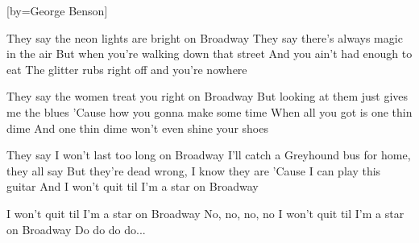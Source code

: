 [by={George Benson}]

  \beginverse
  They say the neon lights are bright on Broadway
  They say there's always magic in the air
  But when you're walking down that street
  And you ain't had enough to eat
  The glitter rubs right off and you're nowhere
  \endverse

  \beginverse
  They say the women treat you right on Broadway
  But looking at them just gives me the blues
  'Cause how you gonna make some time
  When all you got is one thin dime
  And one thin dime won't even shine your shoes
  \endverse

  \beginverse
  They say I won't last too long on Broadway
  I'll catch a Greyhound bus for home, they all say
  But they're dead wrong, I know they are
  'Cause I can play this guitar
  And I won't quit til I'm a star on Broadway
  \endverse

  \beginverse
  I won't quit til I'm a star on Broadway
  No, no, no, no
  I won't quit til I'm a star on Broadway
  Do do do do...
  \endverse
\endsong
